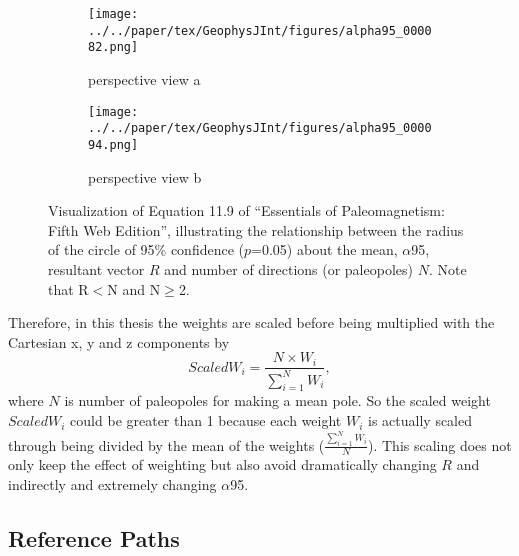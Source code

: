 \begin{figure*}
  \centering
  \begin{subfigure}{.49\textwidth}
    \texttt{[image: ../../paper/tex/GeophysJInt/figures/alpha95\_000082.png]}
    \caption{perspective view a}
  \end{subfigure}
  \begin{subfigure}{.49\textwidth}
    \texttt{[image: ../../paper/tex/GeophysJInt/figures/alpha95\_000094.png]}
    \caption{perspective view b}
  \end{subfigure}
  \caption[Visualization of the equation used to estimate $\alpha$95 from R and
    N]{Visualization of Equation 11.9 of ``Essentials of Paleomagnetism: Fifth
    Web Edition'', illustrating the relationship between the radius of the
    circle of 95\% confidence ($p$=0.05) about the mean, $\alpha$95, resultant
    vector $R$ and number of directions (or paleopoles) $N$. Note that R$<$N and
    N$\geq$2.}\label{fig-alpha95}
\end{figure*}

Therefore, in this thesis the weights are scaled before being multiplied with
the Cartesian x, y and z components by
%
\begin{equation*}
  ScaledW_i=\frac{N \times W_i}{\sum\limits_{i=1}^{N} W_i},
\end{equation*}
%
where $N$ is number of paleopoles for making a mean pole. So the scaled weight
$ScaledW_i$ could be greater than 1 because each weight $W_i$ is actually scaled
through being divided by the mean of the weights ($\frac{\sum\limits_{i=1}^{N}
W_i}{N}$). This scaling does not only keep the effect of weighting but also
avoid dramatically changing $R$ and indirectly and extremely changing
$\alpha$95.

\subsection{Reference Paths}\label{sec:refpath}

